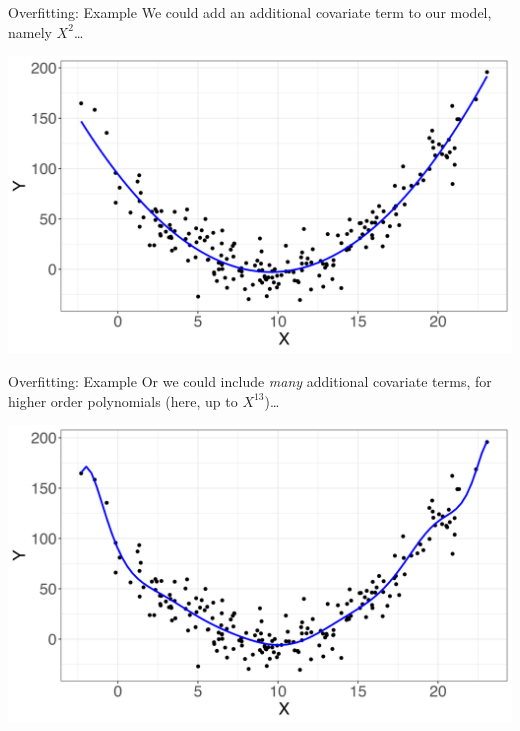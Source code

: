 \documentclass[10pt,t]{beamer}
\begin{document}
\begin{frame}{Overfitting: Example}
We could add an additional covariate term to our model, namely $X^2$\dots

\vspace{0.3cm}

\centering \includegraphics[scale=0.4]{overfit3.png}

\end{frame}

\begin{frame}{Overfitting: Example}
Or we could include \textit{many} additional covariate terms, for higher order polynomials (here, up to $X^{13}$)\dots

\vspace{0.3cm}

\centering \includegraphics[scale=0.4]{overfit4.png}

\end{frame}
\end{document}

